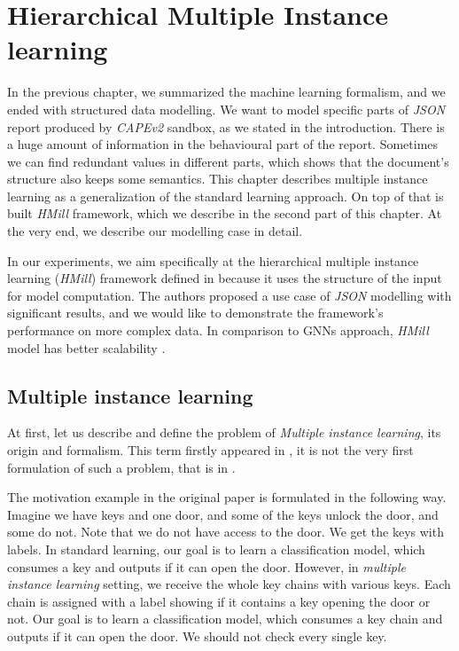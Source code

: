 \chapter{Hierarchical Multiple Instance learning} \label{chap:hmill}
In the previous chapter, we summarized the machine learning formalism, and we ended with structured data modelling. We want to model specific parts of \emph{JSON} report produced by \emph{CAPEv2} sandbox, as we stated in the introduction. There is a huge amount of information in the behavioural part of the report. Sometimes we can find redundant values in different parts, which shows that the document's structure also keeps some semantics. This chapter describes multiple instance learning as a generalization of the standard learning approach. On top of that is built \emph{HMill} framework, which we describe in the second part of this chapter. At the very end, we describe our modelling case in detail.

In our experiments, we aim specifically at the hierarchical multiple instance learning (\emph{HMill}) framework defined in \cite{Mandlik2020} because it uses the structure of the input for model computation. The authors proposed a use case of \emph{JSON} modelling with significant results, and we would like to demonstrate the framework's performance on more complex data. In comparison to GNNs approach, \emph{HMill} model has better scalability \cite{Mandlik2020}. 

\section{Multiple instance learning}
At first, let us describe and define the problem of \emph{Multiple instance learning}, its origin and formalism. This term firstly appeared in \cite{Dietterich1997}, it is not the very first formulation of such a problem, that is in \cite{Keeler1991}.

The motivation example in the original paper \cite{Dietterich1997} is formulated in the following way. Imagine we have keys and one door, and some of the keys unlock the door, and some do not. Note that we do not have access to the door. We get the keys with labels. In standard learning, our goal is to learn a classification model, which consumes a key and outputs if it can open the door. However, in \emph{multiple instance learning} setting, we receive the whole key chains with various keys. Each chain is assigned with a label showing if it contains a key opening the door or not. Our goal is to learn a classification model, which consumes a key chain and outputs if it can open the door. We should not check every single key.

